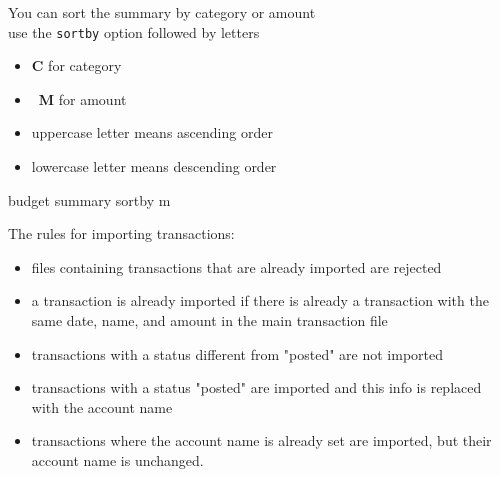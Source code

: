 \documentclass[12pt,letterpaper]{article}
\begin{document}
\begin{framed}
    \begin{minipage}[t][3in][t]{5in}
        \Large
        You can sort the summary by category or amount\\

        use the \lstinline[language=budget,basicstyle=\Large]!sortby! option followed by letters
        \begin{itemize}
            \item \textbf{C} for category
                \item \textbf{M} for amount
            \item uppercase letter means ascending order
            \item lowercase letter means descending order
        \end{itemize}
        \begin{budget}
            budget summary sortby m
                \end{budget}
    \end{minipage}
\end{framed}
\begin{framed}
    \begin{minipage}[t][3in][t]{5in}
        \Large
        The rules for importing transactions:\\
        \normalsize
        \begin{itemize}
            \item files containing transactions that are already imported are rejected
            \item a transaction is already imported if there is already a transaction with the same date, name, and amount in the main transaction file 
            \item transactions with a status different from "posted" are not imported 
            \item transactions with a status "posted" are imported and this info is replaced with the account name
            \item transactions where the account name is already set are imported, but their account name is unchanged.
        \end{itemize}

    \end{minipage}
\end{framed}
\end{document}
